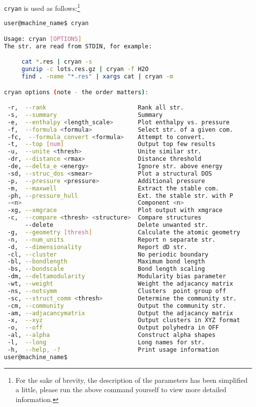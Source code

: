 \documentclass[a4paper, 10pt]{article}
\begin{document}
\verb|cryan| is used as follows:\footnote{For the sake of brevity, the description of the parameters has been simplified a little, please run the above command yourself to view more detailed information.}
\begin{lstlisting}[language={bash}]
user@machine_name$ cryan

Usage: cryan [OPTIONS]
The str. are read from STDIN, for example:

     cat *.res | cryan -s
     gunzip -c lots.res.gz | cryan -f H2O
     find . -name "*.res" | xargs cat | cryan -m

cryan options (note - the order matters):

 -r,  --rank                          Rank all str.
 -s,  --summary                       Summary
 -e,  --enthalpy <length_scale>       Plot enthalpy vs. pressure
 -f,  --formula <formula>             Select str. of a given com.
 -fc,  --formula_convert <formula>    Attempt to convert.
 -t,  --top [num]                     Output top few results
 -u,  --unite <thresh>                Unite similar str.
 -dr, --distance <rmax>               Distance threshold
 -de, --delta_e <energy>              Ignore str. above energy
 -sd, --struc_dos <smear>             Plot a structural DOS
 -p,  --pressure <pressure>           Additional pressure
 -m,  --maxwell                       Extract the stable com.
 -ph, --pressure_hull                 Ext. the stable str. with P
 -<n>                                 Component <n>
 -xg, --xmgrace                       Plot output with xmgrace
 -c,  --compare <thresh> <structure>  Compare structures
      --delete                        Delete unwanted str.
 -g,  --geometry [thresh]             Calculate the atomic geometry
 -n,  --num_units                     Report n separate str.
 -d,  --dimensionality                Report dD str.
 -cl, --cluster                       No periodic boundary
 -bl, --bondlength                    Maximum bond length
 -bs, --bondscale                     Bond length scaling
 -dm, --deltamodularity               Modularity bias parameter
 -wt, --weight                        Weight the adjacancy matrix
 -ns, --notsymm                       Clusters  point group off
 -sc, --struct_comm <thresh>          Determine the community str.
 -cm, --community                     Output the community str.
 -am, --adjacancymatrix               Output the adjacancy matrix
 -x,  --xyz                           Output clusters in XYZ format
 -o,  --off                           Output polyhedra in OFF
 -al, --alpha                         Construct alpha shapes
 -l,  --long                          Long names for str.
 -h,  --help, -?                      Print usage information
user@machine_name$
\end{lstlisting}
\end{document}
